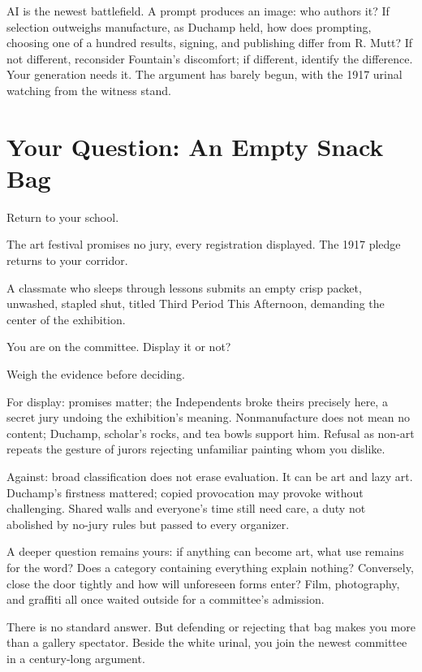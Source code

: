 AI is the newest battlefield. A prompt produces an image: who authors it? If selection outweighs manufacture, as Duchamp held, how does prompting, choosing one of a hundred results, signing, and publishing differ from R. Mutt? If not different, reconsider Fountain's discomfort; if different, identify the difference. Your generation needs it. The argument has barely begun, with the 1917 urinal watching from the witness stand.

\section{Your Question: An Empty Snack Bag}
Return to your school.

The art festival promises no jury, every registration displayed. The 1917 pledge returns to your corridor.

A classmate who sleeps through lessons submits an empty crisp packet, unwashed, stapled shut, titled Third Period This Afternoon, demanding the center of the exhibition.

You are on the committee. Display it or not?

Weigh the evidence before deciding.

For display: promises matter; the Independents broke theirs precisely here, a secret jury undoing the exhibition's meaning. Nonmanufacture does not mean no content; Duchamp, scholar's rocks, and tea bowls support him. Refusal as non-art repeats the gesture of jurors rejecting unfamiliar painting whom you dislike.

Against: broad classification does not erase evaluation. It can be art and lazy art. Duchamp's firstness mattered; copied provocation may provoke without challenging. Shared walls and everyone's time still need care, a duty not abolished by no-jury rules but passed to every organizer.

A deeper question remains yours: if anything can become art, what use remains for the word? Does a category containing everything explain nothing? Conversely, close the door tightly and how will unforeseen forms enter? Film, photography, and graffiti all once waited outside for a committee's admission.

There is no standard answer. But defending or rejecting that bag makes you more than a gallery spectator. Beside the white urinal, you join the newest committee in a century-long argument.

